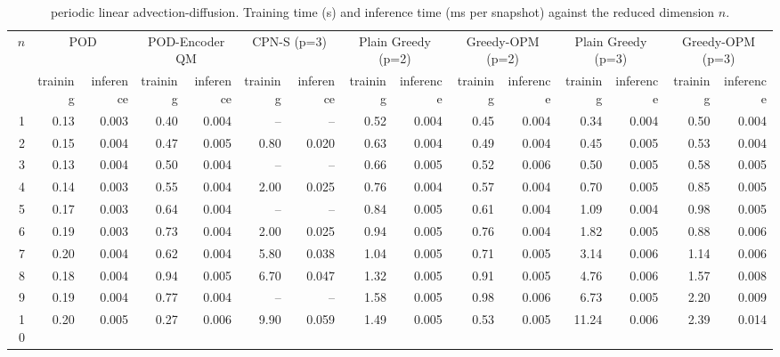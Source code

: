 \begin{table}[tb]
  \centering
  \caption{periodic linear advection-diffusion. Training time (s) and inference time (ms per snapshot) against the reduced dimension \( n \).}
  \label{tab:lin_adv_diff_timings}
  \small
  \setlength{\tabcolsep}{4pt}
  \begin{tabular}{rrrrrrrrrrrrrrr}
    \toprule
    \multirow{2}{*}{\( n \)} & \multicolumn{2}{c}{POD} & \multicolumn{2}{c}{POD-Encoder QM} & \multicolumn{2}{c}{CPN-S (p=3)} & \multicolumn{2}{c}{Plain Greedy (p=2)} & \multicolumn{2}{c}{Greedy-OPM (p=2)} & \multicolumn{2}{c}{Plain Greedy (p=3)} & \multicolumn{2}{c}{Greedy-OPM (p=3)} \\
    \cmidrule(lr){2-3} \cmidrule(lr){4-5} \cmidrule(lr){6-7} \cmidrule(lr){8-9} \cmidrule(lr){10-11} \cmidrule(lr){12-13} \cmidrule(lr){14-15}
     & training & inference & training & inference & training & inference & training & inference & training & inference & training & inference & training & inference \\
    \midrule
    1 & 0.13 & 0.003 & 0.40 & 0.004 & -- & -- & 0.52 & 0.004 & 0.45 & 0.004 & 0.34 & 0.004 & 0.50 & 0.004 \\
    2 & 0.15 & 0.004 & 0.47 & 0.005 & 0.80 & 0.020 & 0.63 & 0.004 & 0.49 & 0.004 & 0.45 & 0.005 & 0.53 & 0.004 \\
    3 & 0.13 & 0.004 & 0.50 & 0.004 & -- & -- & 0.66 & 0.005 & 0.52 & 0.006 & 0.50 & 0.005 & 0.58 & 0.005 \\
    4 & 0.14 & 0.003 & 0.55 & 0.004 & 2.00 & 0.025 & 0.76 & 0.004 & 0.57 & 0.004 & 0.70 & 0.005 & 0.85 & 0.005 \\
    5 & 0.17 & 0.003 & 0.64 & 0.004 & -- & -- & 0.84 & 0.005 & 0.61 & 0.004 & 1.09 & 0.004 & 0.98 & 0.005 \\
    6 & 0.19 & 0.003 & 0.73 & 0.004 & 2.00 & 0.025 & 0.94 & 0.005 & 0.76 & 0.004 & 1.82 & 0.005 & 0.88 & 0.006 \\
    7 & 0.20 & 0.004 & 0.62 & 0.004 & 5.80 & 0.038 & 1.04 & 0.005 & 0.71 & 0.005 & 3.14 & 0.006 & 1.14 & 0.006 \\
    8 & 0.18 & 0.004 & 0.94 & 0.005 & 6.70 & 0.047 & 1.32 & 0.005 & 0.91 & 0.005 & 4.76 & 0.006 & 1.57 & 0.008 \\
    9 & 0.19 & 0.004 & 0.77 & 0.004 & -- & -- & 1.58 & 0.005 & 0.98 & 0.006 & 6.73 & 0.005 & 2.20 & 0.009 \\
    10 & 0.20 & 0.005 & 0.27 & 0.006 & 9.90 & 0.059 & 1.49 & 0.005 & 0.53 & 0.005 & 11.24 & 0.006 & 2.39 & 0.014 \\
    \bottomrule
  \end{tabular}
\end{table}
